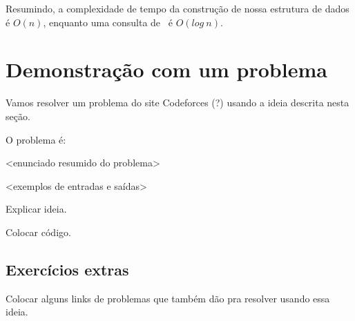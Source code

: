 Resumindo, a complexidade de tempo da construção de nossa estrutura de dados é $O(n)$, enquanto uma consulta de \LCA\ é $O(log\ n)$.

\section{Demonstração com um problema}

Vamos resolver um problema do site Codeforces (?) usando a ideia descrita nesta seção.

O problema é:

<enunciado resumido do problema>

<exemplos de entradas e saídas>

Explicar ideia.

Colocar código.


\subsection{Exercícios extras}

Colocar alguns links de problemas que também dão pra resolver usando essa ideia.